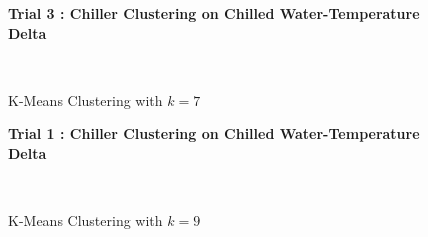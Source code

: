 \begin{figure}[!h]
\centerline{\bfseries\Large Trial 3 : Chiller Clustering on Chilled Water-Temperature Delta}\\
\caption{K-Means Clustering with $k=7$}
\end{figure}
\begin{figure}[!h]
\centerline{\bfseries\Large Trial 1 : Chiller Clustering on Chilled Water-Temperature Delta}\\
\caption{K-Means Clustering with $k=9$}
\end{figure}
